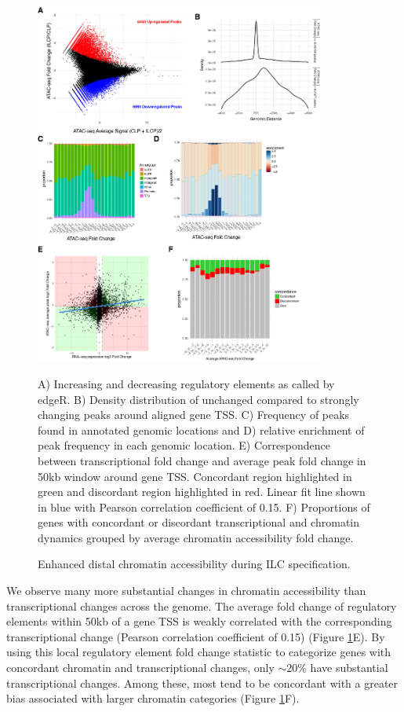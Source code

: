 \begin{figure}[p]
\begin{center}
	\includegraphics[width=0.85\textwidth]{figures/chapter4/Figure_3_atac_peak_locations}
\end{center}
	\caption{Enhanced distal chromatin accessibility during ILC specification.} 
	A) Increasing and decreasing regulatory elements as called by edgeR. B) Density distribution of unchanged compared to strongly changing peaks around aligned gene TSS. C) Frequency of peaks found in annotated genomic locations and D) relative enrichment of peak frequency in each genomic location. E) Correspondence between transcriptional fold change and average peak fold change in 50kb window around gene TSS. Concordant region highlighted in green and discordant region highlighted in red. Linear fit line shown in blue with Pearson correlation coefficient of 0.15. F) Proportions of genes with concordant or discordant transcriptional and chromatin dynamics grouped by average chromatin accessibility fold change.
	\label{fig:chap4_peakloc}
\end{figure}

We observe many more substantial changes in chromatin accessibility than transcriptional changes across the genome. The average fold change of regulatory elements within 50kb of a gene TSS is weakly correlated with the corresponding transcriptional change (Pearson correlation coefficient of 0.15) (Figure \ref{fig:chap4_peakloc}E). By using this local regulatory element fold change statistic to categorize genes with concordant chromatin and transcriptional changes, only $\sim$20\% have substantial transcriptional changes. Among these, most tend to be concordant with a greater bias associated with larger chromatin categories (Figure \ref{fig:chap4_peakloc}F).

